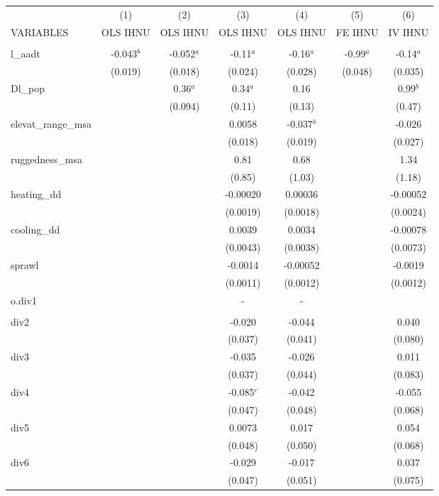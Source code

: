 \documentclass[]{article}
\begin{document}
\begin{tabular}{lcccccc} \hline
 & (1) & (2) & (3) & (4) & (5) & (6) \\
VARIABLES & OLS IHNU & OLS IHNU & OLS IHNU & OLS IHNU & FE IHNU & IV IHNU \\ \hline
 &  &  &  &  &  &  \\
l\_aadt & -0.043$^b$ & -0.052$^a$ & -0.11$^a$ & -0.16$^a$ & -0.99$^a$ & -0.14$^a$ \\
 & (0.019) & (0.018) & (0.024) & (0.028) & (0.048) & (0.035) \\
Dl\_pop &  & 0.36$^a$ & 0.34$^a$ & 0.16 &  & 0.99$^b$ \\
 &  & (0.094) & (0.11) & (0.13) &  & (0.47) \\
elevat\_range\_msa &  &  & 0.0058 & -0.037$^b$ &  & -0.026 \\
 &  &  & (0.018) & (0.019) &  & (0.027) \\
ruggedness\_msa &  &  & 0.81 & 0.68 &  & 1.34 \\
 &  &  & (0.85) & (1.03) &  & (1.18) \\
heating\_dd &  &  & -0.00020 & 0.00036 &  & -0.00052 \\
 &  &  & (0.0019) & (0.0018) &  & (0.0024) \\
cooling\_dd &  &  & 0.0039 & 0.0034 &  & -0.00078 \\
 &  &  & (0.0043) & (0.0038) &  & (0.0073) \\
sprawl &  &  & -0.0014 & -0.00052 &  & -0.0019 \\
 &  &  & (0.0011) & (0.0012) &  & (0.0012) \\
o.div1 &  &  & - & - &  &  \\
 &  &  &  &  &  &  \\
div2 &  &  & -0.020 & -0.044 &  & 0.040 \\
 &  &  & (0.037) & (0.041) &  & (0.080) \\
div3 &  &  & -0.035 & -0.026 &  & 0.011 \\
 &  &  & (0.037) & (0.044) &  & (0.083) \\
div4 &  &  & -0.085$^c$ & -0.042 &  & -0.055 \\
 &  &  & (0.047) & (0.048) &  & (0.068) \\
div5 &  &  & 0.0073 & 0.017 &  & 0.054 \\
 &  &  & (0.048) & (0.050) &  & (0.068) \\
div6 &  &  & -0.029 & -0.017 &  & 0.037 \\
 &  &  & (0.047) & (0.051) &  & (0.075) \\

\end{tabular}
\end{document}
